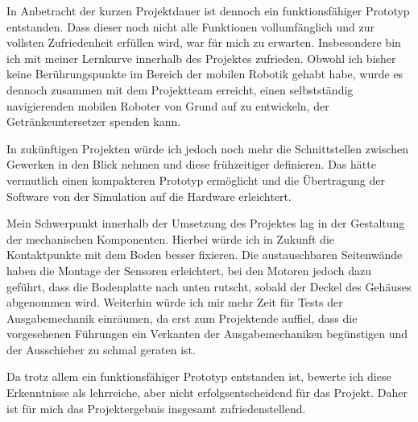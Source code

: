 In Anbetracht der kurzen Projektdauer ist dennoch ein funktionsfähiger Prototyp entstanden.
Dass dieser noch nicht alle Funktionen vollumfänglich und zur vollsten Zufriedenheit erfüllen wird, war für mich zu erwarten.
Insbesondere bin ich mit meiner Lernkurve innerhalb des Projektes zufrieden. Obwohl ich bisher keine Berührungspunkte im Bereich der mobilen Robotik gehabt habe, wurde es dennoch zusammen mit dem Projektteam erreicht, einen selbstständig navigierenden mobilen Roboter von Grund auf zu entwickeln, der Getränkeuntersetzer spenden kann.

In zukünftigen Projekten würde ich jedoch noch mehr die Schnittstellen zwischen Gewerken in den Blick nehmen und diese frühzeitiger definieren. Das hätte vermutlich einen kompakteren Prototyp ermöglicht und die Übertragung der Software von der Simulation auf die Hardware erleichtert.

Mein Schwerpunkt innerhalb der Umsetzung des Projektes lag in der Gestaltung der mechanischen Komponenten. Hierbei würde ich in Zukunft die Kontaktpunkte mit dem Boden
besser fixieren. Die austauschbaren Seitenwände haben die Montage der Sensoren erleichtert, bei den Motoren jedoch dazu geführt, dass die Bodenplatte nach unten rutscht,
sobald der Deckel des Gehäuses abgenommen wird. Weiterhin würde ich mir mehr Zeit für Tests der Ausgabemechanik einräumen, da erst zum Projektende auffiel, dass 
die vorgesehenen Führungen ein Verkanten der Ausgabemechaniken begünstigen und der Ausschieber zu schmal geraten ist. 

Da trotz allem ein funktionsfähiger Prototyp entstanden ist,
bewerte ich diese Erkenntnisse als lehrreiche, aber nicht erfolgsentscheidend für das Projekt. Daher ist für mich das Projektergebnis insgesamt zufriedenstellend.